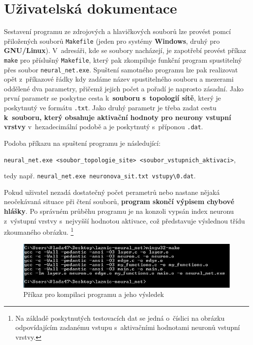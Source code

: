 \documentclass[11pt]{article}
\begin{document}
\section{Uživatelská dokumentace}
Sestavení programu ze zdrojových a hlavičkových souborů lze provést pomcí přiložených souborů \texttt{Makefile} (jeden pro systémy \textbf{Windows}, druhý pro \textbf{GNU/Linux}). V~adresáři, kde se soubory nacházejí, je zapotřebí provést příkaz \texttt{make} pro příslušný \texttt{Makefile}, který pak zkompiluje funkční program spustitelný přes soubor \texttt{neural\_net.exe}. Spuštení samotného programu lze pak realizovat opět z~příkazové řádky kdy zadáme název spustitelného souboru a mezerami oddělené dva parametry, přičemž jejich počet a pořadí je naprosto zásadní. Jako první parametr se poskytne cesta k~\textbf{souboru s~topologií sítě}, který je poskytnutý ve formátu \texttt{.txt}. Jako druhý parametr je třeba zadat cestu \textbf{k~souboru, který obsahuje aktivační hodnoty pro neurony vstupní vrstvy} v~hexadecimální podobě a je poskytnutý s~příponou \texttt{.dat}.

\bigskip

Podoba příkazu na spuštení programu je následující: 

\texttt{neural\_net.exe <soubor\_topologie\_site> <soubor\_vstupnich\_aktivaci>}, 

tedy např. \texttt{neural\_net.exe neuronova\_sit.txt vstupy\textbackslash0.dat}.

\bigskip

Pokud uživatel nezadá dostatečný počet perametrů nebo nastane nějaká neočekávaná situace při čtení souborů, \textbf{program skončí výpisem chybové hlášky}. Po správném průběhu programu je na konzoli vypsán index neuronu z~výstupní vrstvy s~nejvyšší hodnotou aktivace, což představuje výslednou třídu zkoumaného obrázku. \footnote{Na základě poskytnutých testovacích dat se jedná o~číslici na obrázku odpovídajícím zadanému vstupu s~aktivačními hodnotami neuronů vstupní vrstvy.}

\bigskip

\begin{figure}[htbp]
\centering
\includegraphics[width = 15cm]{PCmake.jpg}
\begin{center}
\caption{Příkaz pro kompilaci programu a jeho výsledek}
\end{center}
\end{figure}
\end{document}
